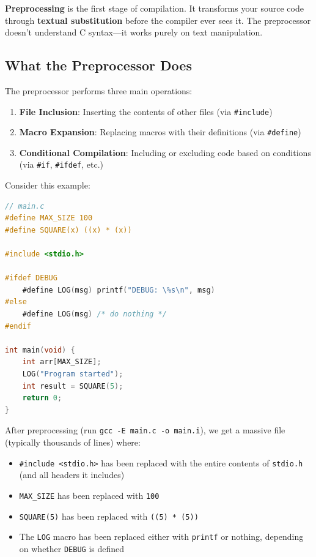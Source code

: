 \textbf{Preprocessing} is the first stage of compilation. It transforms your source code through \textbf{textual substitution} before the compiler ever sees it. The preprocessor doesn't understand C syntax—it works purely on text manipulation.

\subsection{What the Preprocessor Does}

The preprocessor performs three main operations:

\begin{enumerate}
    \item \textbf{File Inclusion}: Inserting the contents of other files (via \texttt{\#include})
    \item \textbf{Macro Expansion}: Replacing macros with their definitions (via \texttt{\#define})
    \item \textbf{Conditional Compilation}: Including or excluding code based on conditions (via \texttt{\#if}, \texttt{\#ifdef}, etc.)
\end{enumerate}

Consider this example:

\begin{lstlisting}[language=C]
// main.c
#define MAX_SIZE 100
#define SQUARE(x) ((x) * (x))

#include <stdio.h>

#ifdef DEBUG
    #define LOG(msg) printf("DEBUG: \%s\n", msg)
#else
    #define LOG(msg) /* do nothing */
#endif

int main(void) {
    int arr[MAX_SIZE];
    LOG("Program started");
    int result = SQUARE(5);
    return 0;
}
\end{lstlisting}

After preprocessing (run \texttt{gcc -E main.c -o main.i}), we get a massive file (typically thousands of lines) where:
\begin{itemize}
    \item \texttt{\#include <stdio.h>} has been replaced with the entire contents of \texttt{stdio.h} (and all headers it includes)
    \item \texttt{MAX\_SIZE} has been replaced with \texttt{100}
    \item \texttt{SQUARE(5)} has been replaced with \texttt{((5) * (5))}
    \item The \texttt{LOG} macro has been replaced either with \texttt{printf} or nothing, depending on whether \texttt{DEBUG} is defined
\end{itemize}

